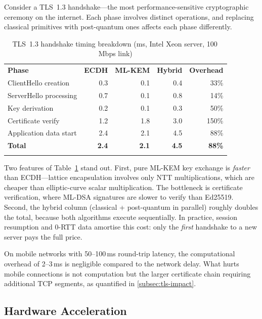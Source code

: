 Consider a TLS~1.3 handshake---the most performance-sensitive cryptographic ceremony on the internet.  Each phase involves distinct operations, and replacing classical primitives with post-quantum ones affects each phase differently.

\begin{table}[t]
\caption{TLS~1.3 handshake timing breakdown (ms, Intel Xeon server, 100\,Mbps link)}
\label{tab:tls-timing}
\begin{tabular}{p{3.5cm}rrrr}
\hline\noalign{\smallskip}
\textbf{Phase} & \textbf{ECDH} & \textbf{ML-KEM} & \textbf{Hybrid} & \textbf{Overhead} \\
\noalign{\smallskip}\svhline\noalign{\smallskip}
ClientHello creation   & 0.3 & 0.1 & 0.4 & 33\% \\
ServerHello processing & 0.7 & 0.1 & 0.8 & 14\% \\
Key derivation         & 0.2 & 0.1 & 0.3 & 50\% \\
Certificate verify     & 1.2 & 1.8 & 3.0 & 150\% \\
Application data start & 2.4 & 2.1 & 4.5 & 88\% \\
\noalign{\smallskip}\hline\noalign{\smallskip}
\textbf{Total}         & \textbf{2.4} & \textbf{2.1} & \textbf{4.5} & \textbf{88\%} \\
\noalign{\smallskip}\hline
\end{tabular}
\end{table}

Two features of Table~\ref{tab:tls-timing} stand out.  First, pure ML-KEM key exchange is \emph{faster} than ECDH---lattice encapsulation involves only NTT multiplications, which are cheaper than elliptic-curve scalar multiplication.  The bottleneck is certificate verification, where ML-DSA signatures are slower to verify than Ed25519.  Second, the hybrid column (classical + post-quantum in parallel) roughly doubles the total, because both algorithms execute sequentially.  In practice, session resumption and 0-RTT data amortise this cost: only the \emph{first} handshake to a new server pays the full price.

On mobile networks with 50--100\,ms round-trip latency, the computational overhead of 2--3\,ms is negligible compared to the network delay.  What hurts mobile connections is not computation but the larger certificate chain requiring additional TCP segments, as quantified in \cref{subsec:tls-impact}.

\subsection{Hardware Acceleration}
\label{subsec:hw-accel}

